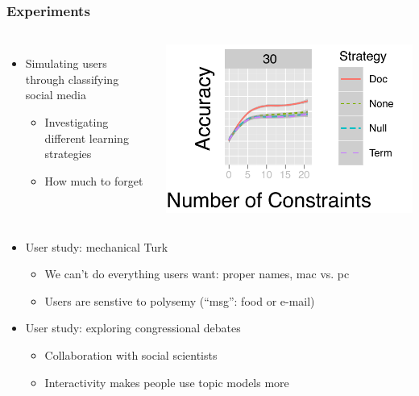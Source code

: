 \begin{frame}

        \frametitle{Experiments}

\begin{columns}


  \begin{itemize}
   \item Simulating users through classifying social media
     \begin{itemize}
       \item Investigating different learning strategies
       \item How much to forget
     \end{itemize}
   \end{itemize}


\begin{center}
\includegraphics[width=\linewidth]{interactive_topic_models/ablation_30_topics}
\end{center}

\end{columns}

\begin{itemize}
    \item User study: mechanical Turk
      \begin{itemize}
        \item We can't do everything users want: proper names, mac vs. pc
        \item Users are senstive to polysemy (``msg'': food or e-mail)
      \end{itemize}
    \item User study: exploring congressional debates
      \begin{itemize}
        \item Collaboration with social scientists
        \item Interactivity makes people use topic models more
       \end{itemize}
  \end{itemize}


\end{frame}

